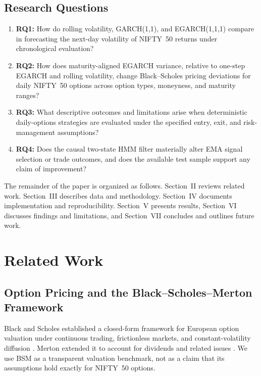 \documentclass[journal]{IEEEtran}
\begin{document}
\subsection*{Research Questions}

\begin{enumerate}
\item \textbf{RQ1:} How do rolling volatility, GARCH(1,1), and EGARCH(1,1,1) compare in forecasting the next-day volatility of NIFTY~50 returns under chronological evaluation?
\item \textbf{RQ2:} How does maturity-aligned EGARCH variance, relative to one-step EGARCH and rolling volatility, change Black--Scholes pricing deviations for daily NIFTY~50 options across option types, moneyness, and maturity ranges?
\item \textbf{RQ3:} What descriptive outcomes and limitations arise when deterministic daily-options strategies are evaluated under the specified entry, exit, and risk-management assumptions?
\item \textbf{RQ4:} Does the causal two-state HMM filter materially alter EMA signal selection or trade outcomes, and does the available test sample support any claim of improvement?
\end{enumerate}

The remainder of the paper is organized as follows. Section~II reviews related work. Section~III describes data and methodology. Section~IV documents implementation and reproducibility. Section~V presents results, Section~VI discusses findings and limitations, and Section~VII concludes and outlines future work.

\section{Related Work}

\subsection{Option Pricing and the Black--Scholes--Merton Framework}

Black and Scholes established a closed-form framework for European option valuation under continuous trading, frictionless markets, and constant-volatility diffusion \cite{black1973}. Merton extended it to account for dividends and related issues \cite{merton1973}. We use BSM as a transparent valuation benchmark, not as a claim that its assumptions hold exactly for NIFTY~50 options.
\end{document}
